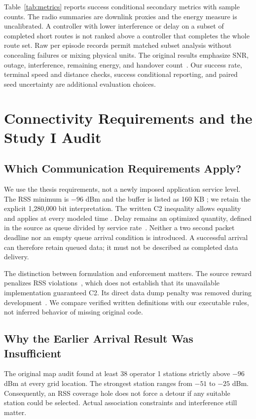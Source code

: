 \documentclass[conference]{IEEEtran}
\begin{document}
Table~\ref{tab:metrics} reports success conditional secondary metrics with
sample counts. The radio summaries are downlink proxies and the energy measure
is uncalibrated. A controller with lower interference or delay on a subset of
completed short routes is not ranked above a controller that completes the
whole route set. Raw per episode records permit matched subset analysis without
concealing failures or mixing physical units.
The original results emphasize SNR, outage, interference, remaining energy,
and handover count~\cite[pp.~16--20, Sec.~7, Figs.~5--8]{thesis}.
Our success rate, terminal speed and distance checks, success conditional
reporting, and paired seed uncertainty are additional evaluation choices.

\section{Connectivity Requirements and the Study I Audit}
\label{sec:audit}
\subsection{Which Communication Requirements Apply?}
We use the thesis requirements, not a newly imposed application service level.
The RSS minimum is $-96$ dBm and the buffer is listed as 160 KB
\cite[p.~15, Table~3]{thesis}; we retain the explicit 1,280,000 bit interpretation.
The written C2 inequality allows equality and applies at every modeled time
\cite[p.~11, Eq.~(12)]{thesis}. Delay remains an optimized quantity, defined in
the source as queue divided by service rate~\cite[p.~9, Eq.~(4)]{thesis}.
Neither a two second packet deadline nor an empty queue arrival condition is
introduced. A successful arrival can therefore retain queued data; it must not
be described as completed data delivery.

The distinction between formulation and enforcement matters. The source reward
penalizes RSS violations~\cite[p.~12, Eq.~(14)]{thesis}, which does not establish
that its unavailable implementation guaranteed C2. Its direct data dump penalty
was removed during development~\cite[pp.~20--21, Sec.~7.3]{thesis}. We compare
verified written definitions with our executable rules, not inferred behavior
of missing original code.

\subsection{Why the Earlier Arrival Result Was Insufficient}
The original map audit found at least 38 operator 1 stations strictly above
$-96$ dBm at every grid location. The strongest station ranges from $-51$ to
$-25$ dBm. Consequently, an RSS coverage hole does not force a detour if any
suitable station could be selected. Actual association constraints and
interference still matter.
\end{document}
